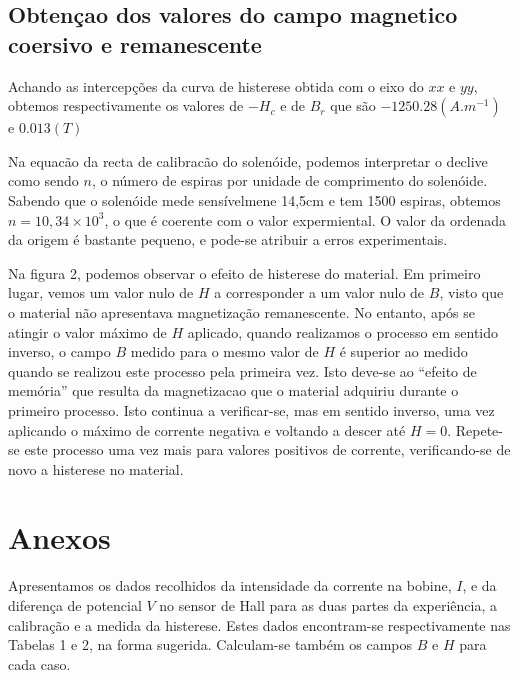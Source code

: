 \documentclass[a4paper]{article}
\begin{document}
\subsection{Obtençao dos valores do campo magnetico coersivo e remanescente}
Achando as intercepções da curva de histerese obtida com o eixo do $xx$ e $yy$, obtemos respectivamente os valores de $-H_c$ e de $B_r$ que são $-1250.28 (A.m^{-1})$ e $0.013 (T)$

Na equacão da recta de calibracão do solenóide, podemos interpretar o declive como sendo $n$, o número de espiras por unidade de comprimento do solenóide. Sabendo que o solenóide mede sensívelmene 14,5cm e tem 1500 espiras, obtemos $n=10,34\times 10^3$, o que é coerente com o valor expermiental. O valor da ordenada da origem é bastante pequeno, e pode-se atribuir a erros experimentais.

Na figura 2, podemos observar o efeito de histerese do material. Em primeiro lugar, vemos um valor nulo de $H$ a corresponder a um valor nulo de $B$, visto que o material não apresentava magnetização remanescente. No entanto, após se atingir o valor máximo de $H$ aplicado, quando realizamos o processo em sentido inverso, o campo $B$ medido para o mesmo valor de $H$ é superior ao medido quando se realizou este processo pela primeira vez. Isto deve-se ao ``efeito de memória'' que resulta da magnetizacao que o material adquiriu durante o primeiro processo. Isto continua a verificar-se, mas em sentido inverso, uma vez aplicando o máximo de corrente negativa e voltando a descer até $H=0$. Repete-se este processo uma vez mais para valores positivos de corrente, verificando-se de novo a histerese no material.

\newpage
\section{Anexos}
Apresentamos os dados recolhidos da intensidade da corrente na bobine, $I$, e da diferença de potencial $V$ no sensor de Hall para as duas partes da experiência, a calibração e a medida da histerese. Estes dados encontram-se respectivamente nas Tabelas 1 e 2, na forma sugerida. Calculam-se também os campos $B$ e $H$ para cada caso.
\end{document}
